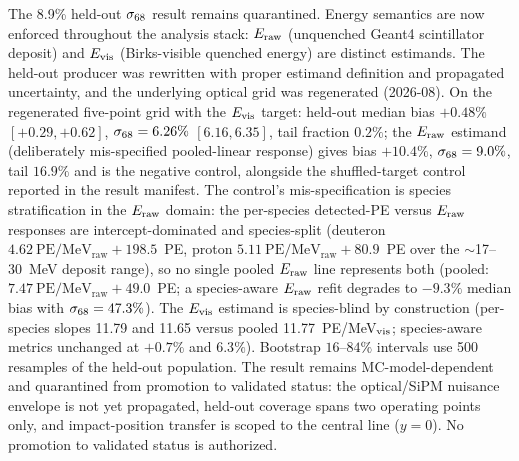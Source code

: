 \begin{publicationhold}
The 8.9\% held-out $\sigma_{68}$ result remains quarantined. Energy semantics are now enforced throughout the analysis stack: $E_{\rm raw}$ (unquenched Geant4 scintillator deposit) and $E_{\rm vis}$ (Birks-visible quenched energy) are distinct estimands. The held-out producer was rewritten with proper estimand definition and propagated uncertainty, and the underlying optical grid was regenerated (2026-08). On the regenerated five-point grid with the $E_{\rm vis}$ target: held-out median bias $+0.48\%$ $[+0.29,+0.62]$, $\sigma_{68} = 6.26\%$ $[6.16,6.35]$, tail fraction $0.2\%$; the $E_{\rm raw}$ estimand (deliberately mis-specified pooled-linear response) gives bias $+10.4\%$, $\sigma_{68} = 9.0\%$, tail $16.9\%$ and is the negative control, alongside the shuffled-target control reported in the result manifest. The control's mis-specification is species stratification in the $E_{\rm raw}$ domain: the per-species detected-PE versus $E_{\rm raw}$ responses are intercept-dominated and species-split (deuteron $4.62~\mathrm{PE/MeV_{raw}} + 198.5$~PE, proton $5.11~\mathrm{PE/MeV_{raw}} + 80.9$~PE over the $\sim$17--30~MeV deposit range), so no single pooled $E_{\rm raw}$ line represents both (pooled: $7.47~\mathrm{PE/MeV_{raw}} + 49.0$~PE; a species-aware $E_{\rm raw}$ refit degrades to $-9.3\%$ median bias with $\sigma_{68} = 47.3\%$). The $E_{\rm vis}$ estimand is species-blind by construction (per-species slopes 11.79 and 11.65 versus pooled 11.77~PE/MeV$_{\rm vis}$; species-aware metrics unchanged at $+0.7\%$ and $6.3\%$). Bootstrap $16$--$84\%$ intervals use 500 resamples of the held-out population. The result remains MC-model-dependent and quarantined from promotion to validated status: the optical/SiPM nuisance envelope is not yet propagated, held-out coverage spans two operating points only, and impact-position transfer is scoped to the central line ($y=0$). No promotion to validated status is authorized.
\end{publicationhold}



